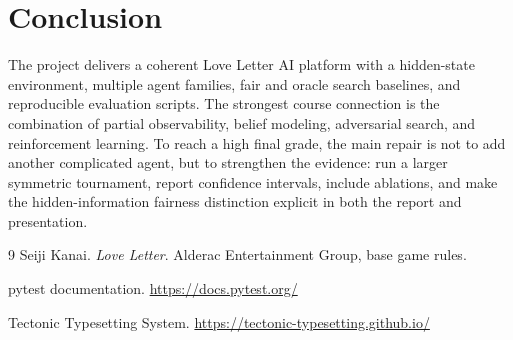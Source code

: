 \documentclass[10pt,twocolumn]{article}
\begin{document}
\section{Conclusion}

The project delivers a coherent Love Letter AI platform with a hidden-state
environment, multiple agent families, fair and oracle search baselines, and
reproducible evaluation scripts. The strongest course connection is the
combination of partial observability, belief modeling, adversarial search, and
reinforcement learning. To reach a high final grade, the main repair is not to
add another complicated agent, but to strengthen the evidence: run a larger
symmetric tournament, report confidence intervals, include ablations, and make
the hidden-information fairness distinction explicit in both the report and
presentation.

\begin{thebibliography}{9}
Seiji Kanai. \emph{Love Letter}. Alderac Entertainment Group, base game rules.

pytest documentation. \url{https://docs.pytest.org/}

Tectonic Typesetting System. \url{https://tectonic-typesetting.github.io/}
\end{thebibliography}
\end{document}
